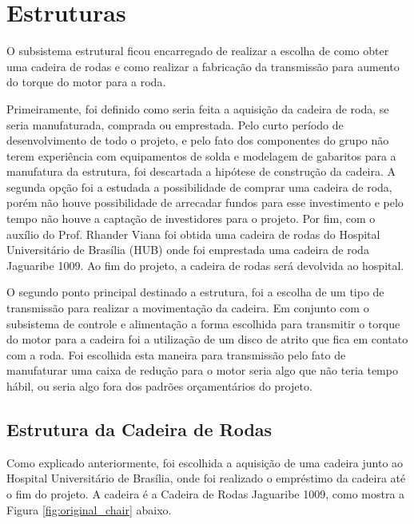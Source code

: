 \chapter{Estruturas}

O subsistema estrutural ficou encarregado
de realizar a escolha de como obter uma cadeira de rodas e como realizar a fabricação da
transmissão para aumento do torque do motor para a roda.

Primeiramente, foi definido como seria feita a aquisição da cadeira de roda, se
seria manufaturada, comprada ou emprestada. Pelo curto período de
desenvolvimento de todo o projeto, e pelo fato dos componentes do grupo não
terem experiência com equipamentos de solda e modelagem de gabaritos para a
manufatura da estrutura, foi descartada a hipótese de construção da cadeira.
A segunda opção foi a estudada a possibilidade de comprar uma cadeira de roda,
porém não houve possibilidade de arrecadar fundos para esse investimento e pelo
tempo não houve a captação de investidores para o projeto. Por fim, com o
auxílio do Prof. Rhander Viana foi obtida uma cadeira de rodas do Hospital
Universitário de Brasília (HUB) onde foi emprestada uma cadeira de roda
Jaguaribe 1009. Ao fim do projeto, a cadeira de rodas será devolvida ao hospital.

O segundo ponto principal destinado a estrutura, foi a escolha de um tipo de
transmissão para realizar a movimentação da cadeira. Em conjunto com o
subsistema de controle e alimentação a forma escolhida para transmitir o torque do motor
para a cadeira foi a utilização de um disco de atrito que fica em contato com a
roda. Foi escolhida esta maneira para transmissão pelo fato de manufaturar uma
caixa de redução para o motor seria algo que não teria tempo hábil, ou seria
algo fora dos padrões orçamentários do projeto.

\section{Estrutura da Cadeira de Rodas}

Como explicado anteriormente, foi escolhida a aquisição de uma cadeira junto ao
Hospital Universitário de Brasília, onde foi realizado o empréstimo da cadeira
até o fim do projeto. A cadeira é a Cadeira de Rodas Jaguaribe 1009, como mostra
 a Figura \ref{fig:original_chair} abaixo.

